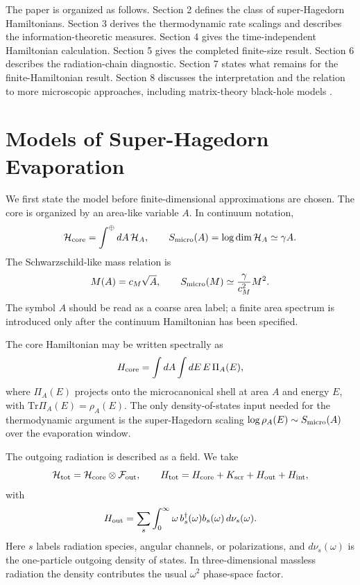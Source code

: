 \documentclass[12pt]{article}
\newcommand{\Tr}{\mathrm{Tr}}
\newcommand{\Htot}{\mathcal H_{\rm tot}}
\newcommand{\Hcore}{\mathcal H_{\rm core}}
\newcommand{\Smicro}{S_{\rm micro}}
\begin{document}
The paper is organized as follows.  Section 2 defines the class of
super-Hagedorn Hamiltonians.  Section 3 derives the thermodynamic
rate scalings and describes the information-theoretic measures.  Section 4
gives the time-independent Hamiltonian calculation.  Section 5 gives the
completed finite-size result.  Section 6 describes the radiation-chain
diagnostic.
Section 7 states what remains for the finite-Hamiltonian result.  Section 8 discusses the
interpretation and the relation to more microscopic approaches, including
matrix-theory black-hole models \cite{BanksFischlerKlebanovSusskind1997}.

\section{Models of Super-Hagedorn Evaporation}

We first state the model before finite-dimensional approximations are chosen.
The core is organized by an area-like variable $A$.  In continuum notation,
\begin{equation}
    \Hcore=\int^{\oplus} dA\,\mathcal H_A ,
    \qquad
    \Smicro(A)=\log \dim\mathcal H_A \simeq \gamma A .
\end{equation}
The Schwarzschild-like mass relation is
\begin{equation}
    M(A)=c_M\sqrt A ,
    \qquad
    \Smicro(M)\simeq \frac{\gamma}{c_M^2}M^2 .
\end{equation}
The symbol $A$ should be read as a coarse area label; a finite area spectrum is
introduced only after the continuum Hamiltonian has been specified.

The core Hamiltonian may be written spectrally as
\begin{equation}
    H_{\rm core}
    =
    \int dA\int dE\,
    E\,\Pi_A(E),
\end{equation}
where $\Pi_A(E)$ projects onto the microcanonical shell at area $A$ and energy
$E$, with $\Tr\Pi_A(E)=\rho_A(E)$.  The only density-of-states input needed for
the thermodynamic argument is the super-Hagedorn scaling
$\log\rho_A(E)\sim \Smicro(A)$ over the evaporation window.

The outgoing radiation is described as a field.  We take
\begin{equation}
    \Htot=\Hcore\otimes\mathcal F_{\rm out},
    \qquad
    H_{\rm tot}=H_{\rm core}+K_{\rm scr}+H_{\rm out}+H_{\rm int},
\end{equation}
with
\begin{equation}
    H_{\rm out}
    =
    \sum_s\int_0^\infty
    \omega\, b_s^\dagger(\omega)b_s(\omega)\,
    d\nu_s(\omega).
\end{equation}
Here $s$ labels radiation species, angular channels, or polarizations, and
$d\nu_s(\omega)$ is the one-particle outgoing density of states.  In
three-dimensional massless radiation the density contributes the usual
$\omega^2$ phase-space factor.
\end{document}
